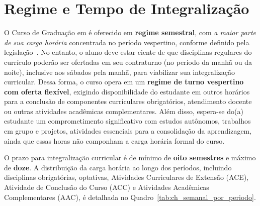 \section{Regime e Tempo de Integralização}
\label{sec:regime}



O Curso de Graduação em \nomecursonovo é oferecido em \textbf{regime semestral}, com \textit{a maior parte de sua carga horária} concentrada no período vespertino, conforme definido pela legislação~\cite{MEC:Portaria:21:2017}. No entanto, o aluno deve estar ciente de que disciplinas regulares do currículo poderão ser ofertadas em seu contraturno (no período da manhã ou da noite), inclusive aos sábados pela manhã, para viabilizar sua integralização curricular. Dessa forma, o curso opera em um \textbf{regime de turno vespertino com oferta flexível}, exigindo disponibilidade do estudante em outros horários para a conclusão de componentes curriculares obrigatórios, atendimento docente ou outras atividades acadêmicas complementares. Além disso, espera-se do(a) estudante um comprometimento significativo com estudos autônomos, trabalhos em grupo e projetos, atividades essenciais para a consolidação da aprendizagem, ainda que essas horas não componham a carga horária formal do curso.

O prazo para integralização curricular é de mínimo de \textbf{oito semestres} e máximo de \textbf{doze}. A distribuição da carga horária ao longo dos períodos, incluindo disciplinas obrigatórias, optativas, Atividades Curriculares de Extensão (ACE), Atividade de Conclusão do Curso (ACC) e Atividades Acadêmicas Complementares (AAC), é detalhada no Quadro~\ref{tab:ch_semanal_por_periodo}.



